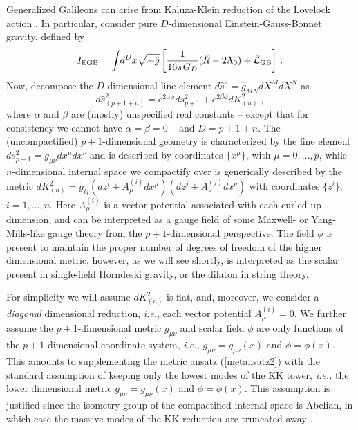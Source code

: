 \documentclass[amsmath,amssymb,11pt]{article}
\newcommand{\beq}{\begin{equation}}
\newcommand{\eeq}{\end{equation}}
\begin{document}
Generalized Galileons can arise from Kaluza-Klein reduction of the Lovelock action \cite{VanAcoleyen11-1}. In particular, consider pure $D$-dimensional Einstein-Gauss-Bonnet gravity, defined by
\beq I_{\text{EGB}}=\int \hspace{-1mm}d^{D}x\sqrt{-\hat{g}}\left[\frac{1}{16\pi G_{D}}(\hat{R}-2\Lambda_{0})+\hat{\mathcal{L}}_{\text{GB}}\right]\,. \label{EGBactionD}\eeq
 Now, decompose the $D$-dimensional line element $d\hat{s}^{2}=\hat{g}_{MN}dX^{M}dX^{N}$ as
\beq d\hat{s}^{2}_{(p+1+n)}=e^{2\alpha\phi}ds^{2}_{p+1}+e^{2\beta\phi}dK^{2}_{(n)}\;, \label{metansatz2}\eeq
where $\alpha$ and $\beta$ are (mostly) unspecified real constants -- except that for consistency we cannot have $\alpha=\beta=0$ --  and $D=p+1+n$. The (uncompactified) $p+1$-dimensional geometry is characterized by the line element $ds^{2}_{p+1}=g_{\mu\nu}dx^{\mu}dx^{\nu}$ and is described by coordinates $\{x^{\mu}\}$, with $\mu=0,...,p$, while $n$-dimensional internal space we compactify over is generically described by the metric $dK_{(n)}^{2}=\tilde{g}_{ij}(dz^{i}+A_{\mu}^{(i)}dx^{\mu})(dz^{j}+A_{\nu}^{(j)}dx^{\nu})$ with coordinates $\{z^{i}\}$, $i=1,...,n$. Here $A^{(i)}_{\mu}$ is a vector potential associated with each curled up dimension, and can be interpreted as a gauge field of some Maxwell- or Yang-Mills-like gauge theory from the $p+1$-dimensional perspective. The field $\phi$ is present to maintain the proper number of degrees of freedom of the higher dimensional metric, however, as we will see shortly, is interpreted as the scalar present in single-field Horndeski gravity, or the dilaton in string theory.

 For simplicity we will assume $dK^{2}_{(n)}$ is flat, and, moreover, we consider a \emph{diagonal} dimensional reduction, \emph{i.e.}, each vector potential $A^{(i)}_{\mu}=0$. We further assume the $p+1$-dimensional metric $g_{\mu\nu}$ and scalar field $\phi$ are only functions of the $p+1$-dimensional coordinate system, \emph{ i.e.,} $g_{\mu\nu}=g_{\mu\nu}(x)$ and $\phi=\phi(x)$. This amounts to supplementing the metric ansatz (\ref{metansatz2}) with the standard assumption of keeping only the lowest modes of the KK tower,\emph{ i.e.,} the lower dimensional metric $g_{\mu\nu}=g_{\mu\nu}(x)$ and $\phi=\phi(x)$. This assumption is justified since the isometry group of the compactified internal space  is Abelian, in which case the massive modes of the KK reduction are truncated away \cite{Gouteraux:2011qh}. 
\end{document}
